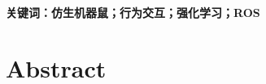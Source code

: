 %
%
%

%
%

\vspace{4ex}\noindent\textbf{\heiti 关键词：仿生机器鼠；行为交互；强化学习；ROS}
\newpage

\topskip=0pt

\vspace*{2mm}

\begin{spacing}{0.95}
  \centering
  \heiti{}\textbf{\thesisTitleEN}
\end{spacing}

\vspace*{17mm}

{\let\clearpage\relax \chapter*{
  \textmd{Abstract}\vskip -3bp}}
\setcounter{page}{2}


